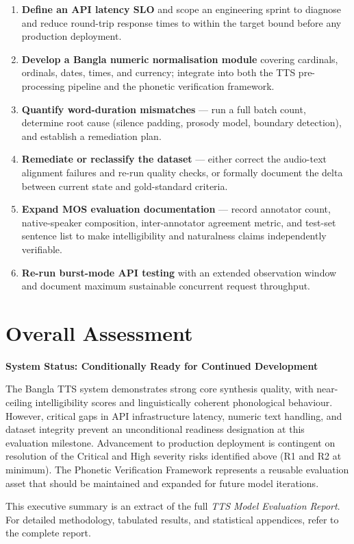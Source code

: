\documentclass[12pt, a4paper]{article}
\newcommand{\caution}[1]{\textcolor{status-warn}{\textbf{#1}}}
\begin{document}
\begin{enumerate}[label=\textbf{\arabic*.}, leftmargin=2em, itemsep=0.3em]
  \item \textbf{Define an API latency SLO} and scope an engineering sprint to diagnose and reduce round-trip response times to within the target bound before any production deployment.
  \item \textbf{Develop a Bangla numeric normalisation module} covering cardinals, ordinals, dates, times, and currency; integrate into both the TTS pre-processing pipeline and the phonetic verification framework.
  \item \textbf{Quantify word-duration mismatches} — run a full batch count, determine root cause (silence padding, prosody model, boundary detection), and establish a remediation plan.
  \item \textbf{Remediate or reclassify the dataset} — either correct the audio-text alignment failures and re-run quality checks, or formally document the delta between current state and gold-standard criteria.
  \item \textbf{Expand MOS evaluation documentation} — record annotator count, native-speaker composition, inter-annotator agreement metric, and test-set sentence list to make intelligibility and naturalness claims independently verifiable.
  \item \textbf{Re-run burst-mode API testing} with an extended observation window and document maximum sustainable concurrent request throughput.
\end{enumerate}

\section{Overall Assessment}

\begin{center}
\colorbox{light-gray}{%
  \begin{minipage}{0.88\textwidth}
    \vspace{0.6em}
    \centering
    {\large \caution{System Status: Conditionally Ready for Continued Development}}\\[0.5em]
    \raggedright
    The Bangla TTS system demonstrates strong core synthesis quality, with near-ceiling intelligibility scores and linguistically coherent phonological behaviour. However, critical gaps in API infrastructure latency, numeric text handling, and dataset integrity prevent an unconditional readiness designation at this evaluation milestone. Advancement to production deployment is contingent on resolution of the Critical and High severity risks identified above (R1 and R2 at minimum). The Phonetic Verification Framework represents a reusable evaluation asset that should be maintained and expanded for future model iterations.
    \vspace{0.6em}
  \end{minipage}%
}
\end{center}

\vspace{1.5em}
\noindent\textcolor{mid-gray}{\small This executive summary is an extract of the full \textit{TTS Model Evaluation Report}. For detailed methodology, tabulated results, and statistical appendices, refer to the complete report.}
\end{document}
